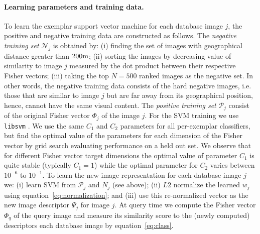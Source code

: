 \documentclass[table]{article} %
\begin{document}
	    \vspace{-4mm}
\paragraph{Learning parameters and training data.}
			To learn the exemplar support vector machine for each database image $j$, the positive and negative training data are constructed as follows. 
			The \emph{negative training set} $\mathcal N_j$ is obtained by: (i) finding the set of images with geographical distance greater than $200{\rm m}$; (ii)  sorting the images by decreasing value of similarity to image $j$ measured by the dot product between their respective Fisher vectors; (iii) taking the top $N=500$ ranked images as the negative set. 
			In other words, the negative training data consists of the hard negative images, i.e. those that are similar to image $j$ but are far away from its geographical position, hence, cannot have the same visual content. The \emph{positive training set} $\mathcal P_j$
			 consist of the original Fisher vector $\Phi_j$ of the image $j$.
			For the SVM training we use {\tt libsvm} \cite{libsvm}. %
			 We use the same $C_1$ and $C_2$ parameters for all per-exemplar classifiers, but find the optimal value of the parameters for each dimension of the Fisher vector by grid search evaluating performance on a held out set.
			 We observe that for different Fisher vector target dimensions the optimal value of parameter $C_1$ is quite stable (typically $C_1=1$) while the optimal parameter for $C_2$ varies between $10^{-6}$ to $10^{-1}$.
			To learn the new image representation for each database image $j$ we: (i) learn SVM from $\mathcal P_j$ and $N_j$ (see above); (ii) $L2$ normalize the learned $w_j$ using equation~\eqref{eq:normalization}; and (iii) use this re-normalized vector as the new image descriptor $\Psi_j$ for image $j$. At query time we compute the Fisher vector $\Phi_q$ of the query image and measure its similarity score to the (newly computed) descriptors each database image by equation~\eqref{eq:class}.
		
\end{document}
